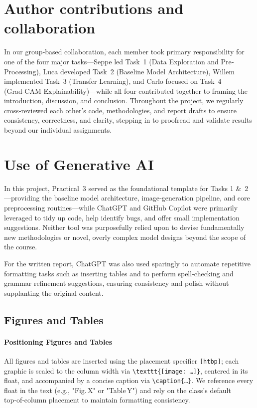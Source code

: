 \documentclass[conference]{IEEEtran}
\begin{document}
\section{Author contributions and collaboration}

In our group‐based collaboration, each member took primary responsibility for one of the four major tasks—Seppe led Task 1 (Data Exploration and Pre‐Processing), Luca developed Task 2 (Baseline Model Architecture), Willem implemented Task 3 (Transfer Learning), and Carlo focused on Task 4 (Grad‑CAM Explainability)—while all four contributed together to framing the introduction, discussion, and conclusion. Throughout the project, we regularly cross‐reviewed each other’s code, methodologies, and report drafts to ensure consistency, correctness, and clarity, stepping in to proofread and validate results beyond our individual assignments.

\section{Use of Generative AI}

In this project, Practical 3 served as the foundational template for Tasks 1 \& 2—providing the baseline model architecture, image‐generation pipeline, and core preprocessing routines—while ChatGPT and GitHub Copilot were primarily leveraged to tidy up code, help identify bugs, and offer small implementation suggestions. Neither tool was purposefully relied upon to devise fundamentally new methodologies or novel, overly complex model designs beyond the scope of the course. 

For the written report, ChatGPT was also used sparingly to automate repetitive formatting tasks such as inserting tables and to perform spell‑checking and grammar refinement suggestions, ensuring consistency and polish without supplanting the original content.

\subsection{Figures and Tables}

\paragraph{Positioning Figures and Tables}

All figures and tables are inserted using the placement specifier \verb|[htbp]|; each graphic is scaled to the column width via
\verb|\texttt{[image: …]}|, centered in its float, and accompanied by a concise caption via \verb|\caption{…}|. We reference every float in the text (e.g., "Fig. X" or "Table Y") and rely on the class’s default top‑of‑column placement to maintain formatting consistency.
\end{document}
